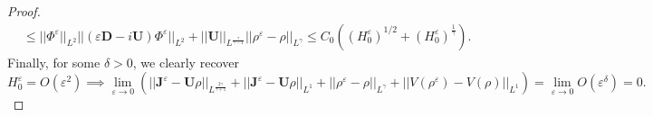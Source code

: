 \documentclass[10pt,a4paper]{amsart}
\begin{document}
\begin{proof}
\begin{align*}
     &\leq ||\Phi^\varepsilon||_{L^2}||(\varepsilon\textbf{D}-i\textbf{U})\Phi^\varepsilon||_{L^{2}}+||\textbf{U}||_{L^{\frac{\gamma}{\gamma-1}}}||\rho^\varepsilon-\rho||_{L^{\gamma}}\leq C_0((H^\varepsilon_0)^{1/2}+(H^\varepsilon_0)^{\frac{1}{\gamma}}).
\end{align*}
Finally, for some $\delta>0$, we clearly recover 
\begin{equation}
\label{eq:convtryoneoasefCyproof}
H^\varepsilon_0=O(\varepsilon^2)\implies\lim_{\varepsilon\to 0}(||\textbf{J}^\varepsilon-\textbf{U}\rho||_{L^{\frac{2\gamma}{\gamma+1}}}+||\textbf{J}^\varepsilon-\textbf{U}\rho||_{L^1}+||\rho^\varepsilon-\rho||_{L^\gamma}+||V(\rho^\varepsilon)-V(\rho)||_{L^1})=\lim_{\varepsilon\to 0}O(\varepsilon^{\delta})=0.
 \end{equation}
\end{proof}
\end{document}
